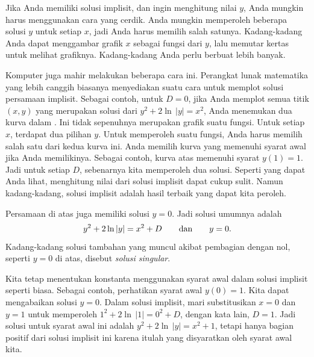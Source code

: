 Jika Anda memiliki solusi implisit, dan
ingin menghitung nilai
$y$, Anda mungkin harus menggunakan cara yang cerdik.  Anda mungkin memperoleh beberapa solusi $y$
untuk setiap $x$, jadi Anda harus memilih salah satunya.  Kadang-kadang Anda dapat
menggambar grafik $x$ sebagai fungsi dari $y$, lalu memutar kertas untuk
melihat grafiknya.
Kadang-kadang Anda perlu berbuat lebih banyak.

Komputer juga mahir melakukan beberapa cara ini.
Perangkat lunak matematika yang lebih canggih biasanya menyediakan suatu
cara untuk memplot solusi persamaan implisit.
Sebagai contoh, untuk $D=0$, jika Anda memplot semua titik $(x,y)$ yang
merupakan solusi dari $y^2+2\ln \, \lvert y\rvert=x^2$,
Anda menemukan dua kurva dalam .  Ini tidak sepenuhnya
merupakan grafik suatu fungsi. Untuk setiap $x$, terdapat dua pilihan $y$.
Untuk memperoleh suatu fungsi, Anda harus memilih salah satu dari kedua kurva ini.
Anda memilih kurva yang memenuhi syarat awal jika Anda memilikinya.
Sebagai contoh, kurva atas memenuhi syarat $y(1)=1$.
Jadi untuk setiap $D$, sebenarnya kita memperoleh dua solusi.
Seperti yang dapat Anda lihat, menghitung nilai dari solusi implisit dapat cukup
sulit.  Namun kadang-kadang, solusi implisit adalah hasil terbaik yang dapat kita peroleh.

\begin{myfig}
\capstart
{}
\caption{Solusi implisit $y^2+2\ln \, \lvert y\rvert = x^2$
untuk $y'=\frac{xy}{y^2+1}$.\label{implicitsols:fig}}
\end{myfig}

Persamaan di atas juga memiliki solusi $y=0$.
Jadi solusi umumnya adalah
\begin{equation*}
y^2 + 2 \ln \, \lvert y \rvert = x^2 + D \qquad \text{dan} \qquad y=0.
\avoidbreak
\end{equation*}
Kadang-kadang solusi tambahan yang muncul
akibat pembagian dengan nol, seperti
$y=0$ di atas,
disebut \emph{solusi singular}.

Kita tetap menentukan konstanta menggunakan syarat awal dalam solusi
implisit seperti biasa.  Sebagai contoh, perhatikan syarat awal
$y(0)=1$.  Kita dapat mengabaikan solusi $y=0$.  Dalam solusi implisit,
mari substitusikan $x=0$ dan $y=1$ untuk memperoleh $1^2 + 2 \ln \, \lvert 1 \rvert = 0^2 +
D$, dengan kata lain, $D=1$.  Jadi solusi untuk syarat awal ini
adalah $y^2 + 2 \ln \, \lvert y \rvert = x^2 + 1$, tetapi hanya bagian
positif dari solusi implisit ini karena itulah yang disyaratkan oleh syarat awal kita.

